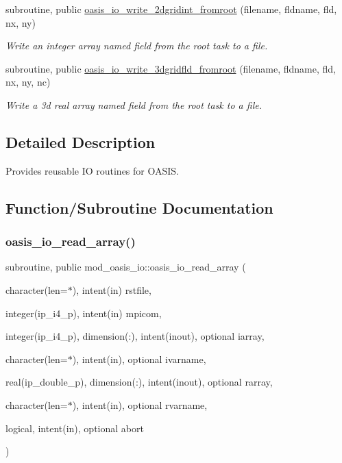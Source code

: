 \begin{DoxyCompactItemize}
subroutine, public \hyperlink{namespacemod__oasis__io_a432ecb26e0e2d8387c1601ea6cc68668}{oasis\+\_\+io\+\_\+write\+\_\+2dgridint\+\_\+fromroot} (filename, fldname, fld, nx, ny)
\begin{DoxyCompactList}\small\item\em Write an integer array named field from the root task to a file. \end{DoxyCompactList}\item 
subroutine, public \hyperlink{namespacemod__oasis__io_aa967e930e5d6199bbc6ec9a4f3c7069e}{oasis\+\_\+io\+\_\+write\+\_\+3dgridfld\+\_\+fromroot} (filename, fldname, fld, nx, ny, nc)
\begin{DoxyCompactList}\small\item\em Write a 3d real array named field from the root task to a file. \end{DoxyCompactList}\end{DoxyCompactItemize}


\subsection{Detailed Description}
Provides reusable IO routines for O\+A\+S\+IS. 

\subsection{Function/\+Subroutine Documentation}
\mbox{\label{namespacemod__oasis__io_a8b604f89345d74c74c6bc3b4760b2e29}} 
\subsubsection{\texorpdfstring{oasis\+\_\+io\+\_\+read\+\_\+array()}{oasis\_io\_read\_array()}}
{\footnotesize\ttfamily subroutine, public mod\+\_\+oasis\+\_\+io\+::oasis\+\_\+io\+\_\+read\+\_\+array (\begin{DoxyParamCaption}\item[{character(len=$\ast$), intent(in)}]{rstfile,  }\item[{integer(ip\+\_\+i4\+\_\+p), intent(in)}]{mpicom,  }\item[{integer(ip\+\_\+i4\+\_\+p), dimension(\+:), intent(inout), optional}]{iarray,  }\item[{character(len=$\ast$), intent(in), optional}]{ivarname,  }\item[{real(ip\+\_\+double\+\_\+p), dimension(\+:), intent(inout), optional}]{rarray,  }\item[{character(len=$\ast$), intent(in), optional}]{rvarname,  }\item[{logical, intent(in), optional}]{abort }\end{DoxyParamCaption})}



